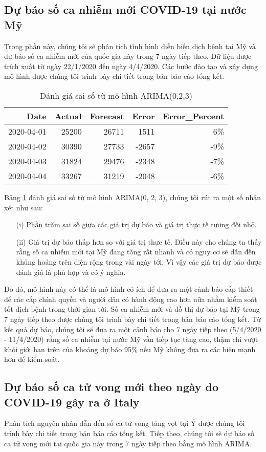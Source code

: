 \documentclass[12pt, a4paper,oneside]{book}
\theoremstyle{definition}
\begin{document}
\subsection{Dự báo số ca nhiễm mới COVID-19 tại nước Mỹ}
Trong phần này, chúng tôi sẽ phân tích tình hình diễn biến dịch bệnh tại Mỹ và dự báo số ca nhiễm mới của quốc gia này trong 7 ngày tiếp theo. Dữ liệu được trích xuất từ ngày 22/1/2020 đến ngày 4/4/2020. Các bước đào tạo và xây dựng mô hình được chúng tôi trình bày chi tiết trong bản báo cáo tổng kết.
\begin{table}[!h]	
	\caption{Đánh giá sai số từ mô hình ARIMA(0,2,3)}
	\label{u1}
	\centering 
	\fontsize{8}{10} \selectfont
	\begin{tabular}[t]{rrrrr}
		\toprule
		Date &Actual & Forecast & Error & Error\_Percent\\
		\midrule
		\rowcolor{gray!6} 2020-04-01 &25200 & 26711 & 1511 & 6\%\\
		2020-04-02 &30390 & 27733 & -2657 & -9\%\\
		\rowcolor{gray!6} 2020-04-03 &31824 & 29476 & -2348 & -7\%\\
	    2020-04-04 &33267 & 31219 & -2048 & -6\%\\
		\bottomrule
	\end{tabular}
\end{table}
Bảng \ref{u1} đánh giá sai số từ mô hình ARIMA(0, 2, 3), chúng tôi rút ra một số nhận xét như sau:
\begin{itemize}
	\item[(i)] Phần trăm sai số giữa các giá trị dự báo và giá trị thực tế tương đối nhỏ.
	\item[(ii)] Giá trị dự báo thấp hơn so với giá trị thực tế. Điều này cho chúng ta thấy rằng số ca nhiễm mới tại Mỹ đang tăng rất nhanh và có nguy cơ sẽ dẫn đến khủng hoảng trên diện rộng trong vài ngày tới. Vì vậy các giá trị dự báo được đánh giá là phù hợp và có ý nghĩa.
\end{itemize}
Do đó, mô hình này có thể là mô hình có ích để đưa ra một cảnh báo cấp thiết để các cấp chính quyền và người dân có hành động cao hơn nữa nhằm kiểm soát tốt dịch bệnh trong thời gian tới. Số ca nhiễm mới và đồ thị dự báo tại Mỹ trong 7 ngày tiếp theo được chúng tôi trình bày chi tiết trong bản báo cáo tổng kết. Từ kết quả dự báo, chúng tôi sẽ đưa ra một cảnh báo cho 7 ngày tiếp theo (5/4/2020 - 11/4/2020) rằng số ca nhiễm tại nước Mỹ vẫn tiếp tục tăng cao, thậm chí vượt khỏi giới hạn trên của khoảng dự báo 95\% nếu Mỹ không đưa ra các biện mạnh hơn để kiểm soát.
\subsection{Dự báo số ca tử vong mới theo ngày do COVID-19 gây ra ở Italy}
Phân tích nguyên nhân dẫn đến số ca tử vong tăng vọt tại Ý được chúng tôi trình bày chi tiết trong bản báo cáo tổng kết. Tiếp theo, chúng tôi sẽ dự báo số ca tử vong mới tại quốc gia này trong 7 ngày tiếp theo bằng mô hình ARIMA.
\end{document}

